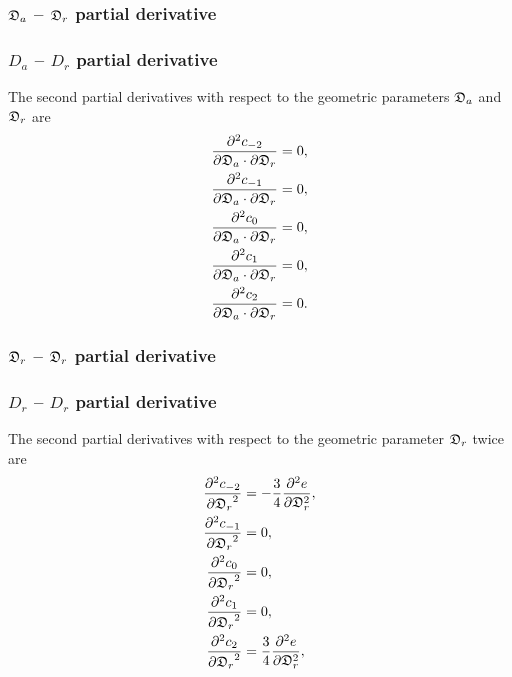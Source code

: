 \begin{latexonly}
    \subsubsection{$\mathfrak{D}_a$ -- $\mathfrak{D}_r$ partial derivative}
\end{latexonly}
\begin{htmlonly}
    \subsubsection{$D_a$ -- $D_r$ partial derivative}
\end{htmlonly}

The second partial derivatives with respect to the geometric parameters $\mathfrak{D}_a$ and $\mathfrak{D}_r$ are
\begin{subequations}
\begin{align}
    \frac{\partial^2 c_{-2}}{\partial \mathfrak{D}_a \cdot \partial \mathfrak{D}_r}  &=  0, \\
    \frac{\partial^2 c_{-1}}{\partial \mathfrak{D}_a \cdot \partial \mathfrak{D}_r} &= 0, \\
    \frac{\partial^2 c_{0}}{\partial \mathfrak{D}_a \cdot \partial \mathfrak{D}_r}  &= 0, \\
    \frac{\partial^2 c_{1}}{\partial \mathfrak{D}_a \cdot \partial \mathfrak{D}_r}  &= 0, \\
    \frac{\partial^2 c_{2}}{\partial \mathfrak{D}_a \cdot \partial \mathfrak{D}_r}  &= 0.
\end{align}
\end{subequations}



\begin{latexonly}
    \subsubsection{$\mathfrak{D}_r$ -- $\mathfrak{D}_r$ partial derivative}
\end{latexonly}
\begin{htmlonly}
    \subsubsection{$D_r$ -- $D_r$ partial derivative}
\end{htmlonly}

The second partial derivatives with respect to the geometric parameter $\mathfrak{D}_r$ twice are
\begin{subequations}
\begin{align}
    \frac{\partial^2 c_{-2}}{{\partial \mathfrak{D}_r}^2}  &=  - \frac{3}{4} \frac{\partial^2 e}{\partial \mathfrak{D}_r^2}, \\
    \frac{\partial^2 c_{-1}}{{\partial \mathfrak{D}_r}^2} &= 0, \\
    \frac{\partial^2 c_{0}}{{\partial \mathfrak{D}_r}^2}  &= 0, \\
    \frac{\partial^2 c_{1}}{{\partial \mathfrak{D}_r}^2}  &= 0, \\
    \frac{\partial^2 c_{2}}{{\partial \mathfrak{D}_r}^2}  &= \frac{3}{4} \frac{\partial^2 e}{\partial \mathfrak{D}_r^2},
\end{align}
\end{subequations}

